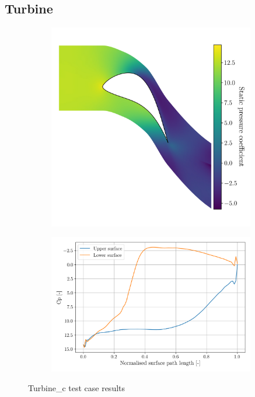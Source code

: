 \documentclass{article}
\begin{document}
\subsection{Turbine}

\begin{figure}[H]
    \centering
    \begin{subfigure}{0.44\textwidth}
        \centering
        \includegraphics[width=0.99\textwidth]{figures/turbine_c_cp.png}
        \caption{}
        \label{fig:turbine_c_cp}
    \end{subfigure}
    \begin{subfigure}{0.55\textwidth}
        \centering
        \includegraphics[width=0.99\textwidth]{figures/turbine_c_surface_cp.png}
        \caption{}
        \label{fig:turbine_c_surface_cp}
    \end{subfigure}
    \caption{Turbine\_c test case results}
\end{figure}
\end{document}
